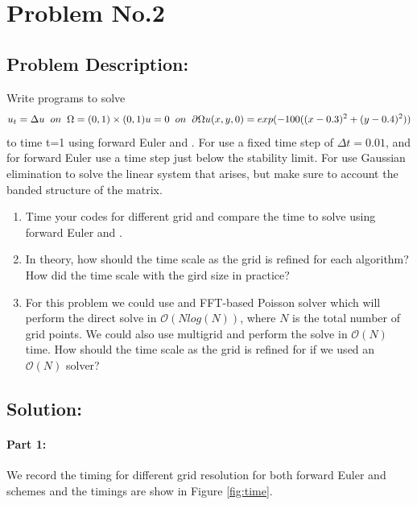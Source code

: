 \section{Problem No.2} \label{sec:prob2}
\subsection{Problem Description:} 
Write programs to solve 
$$
u_{t} = \Delta u \;\; on \;\; \Omega = (0,1) \times (0,1)\\
u=0 \;\; on \;\; \partial \Omega \\
u(x,y,0) = exp(-100((x-0.3)^{2} + (y-0.4)^{2}))
$$
to time t=1 using forward Euler and \cn. For \protect{\cn} use a fixed time step of $\Delta t =0.01$, and for forward Euler use a time step just below the stability limit. For \protect{\cn} use Gaussian elimination to solve the linear system that arises, but make sure to account the banded structure of the matrix.
\begin{enumerate}
\item Time your codes for different grid and compare the time to solve using forward Euler and \cn. 
\item In theory, how should the time scale as the grid is refined for each algorithm? How did the time scale with the gird size in practice?
\item For this problem we could use and FFT-based Poisson solver which will perform the direct solve in $\mathcal{O}(Nlog(N))$, where $N$ is the total number of grid points. We could also use multigrid and perform the solve in $\mathcal{O}(N)$ time. How should the time scale as the grid is refined for \protect{\cn} if we used an $\mathcal{O}(N)$ solver? 
\end{enumerate}

\subsection{Solution:}
\paragraph{Part 1:} We record the timing for different grid resolution for both forward Euler and \protect{\cn} schemes and the timings are show in Figure \ref{fig:time}. 


